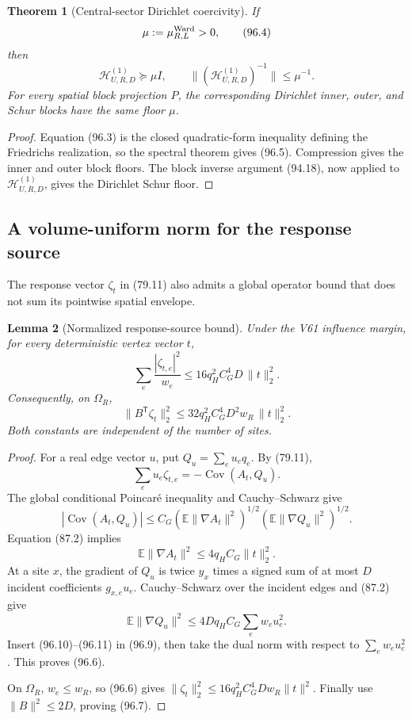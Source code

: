 \documentclass[11pt]{article}
\newtheorem{theorem}{Theorem}[section]
\newtheorem{lemma}[theorem]{Lemma}
\theoremstyle{remark}
\begin{document}
\begin{theorem}[Central-sector Dirichlet coercivity]
\label{thm:v17v96-dirichlet}
If
\[
 \mu:=\mu_{R,L}^{\rm Ward}>0,                       \tag{96.4}
\]
then
\[
\boxed{
 \mathscr H_{U,R,D}^{(1)}\succeq\mu I,
 \qquad
 \| (\mathscr H_{U,R,D}^{(1)})^{-1}\|
 \leq\mu^{-1}.}                                    \tag{96.5}
\]
For every spatial block projection \(P\), the corresponding
Dirichlet inner, outer, and Schur blocks have the same floor \(\mu\).
\end{theorem}

\begin{proof}
Equation (96.3) is the closed quadratic-form inequality defining the
Friedrichs realization, so the spectral theorem gives (96.5).
Compression gives the inner and outer block floors.  The block inverse
argument (94.18), now applied to
\(\mathscr H_{U,R,D}^{(1)}\), gives the Dirichlet Schur floor.
\end{proof}

\subsection{A volume-uniform norm for the response source}

The response vector \(\zeta_t\) in (79.11) also admits a global
operator bound that does not sum its pointwise spatial envelope.

\begin{lemma}[Normalized response-source bound]
\label{lem:v17v96-source}
Under the V61 influence margin, for every deterministic vertex vector
\(t\),
\[
\boxed{
 \sum_e\frac{|\zeta_{t,e}|^2}{w_e}
 \leq16q_H^2C_G^4D\,\|t\|_2^2.}                    \tag{96.6}
\]
Consequently, on \(\Omega_R\),
\[
 \|B^{\mathsf T}\zeta_t\|_2^2
 \leq32q_H^2C_G^4D^2w_R\,\|t\|_2^2.               \tag{96.7}
\]
Both constants are independent of the number of sites.
\end{lemma}

\begin{proof}
For a real edge vector \(u\), put \(Q_u=\sum_eu_eq_e\).  By
(79.11),
\[
 \sum_eu_e\zeta_{t,e}=-\operatorname{Cov}(A_t,Q_u).\tag{96.8}
\]
The global conditional Poincar\'e inequality and Cauchy--Schwarz give
\[
 |\operatorname{Cov}(A_t,Q_u)|
 \leq C_G
  (\mathbb E\|\nabla A_t\|^2)^{1/2}
  (\mathbb E\|\nabla Q_u\|^2)^{1/2}.                \tag{96.9}
\]
Equation (87.2) implies
\[
 \mathbb E\|\nabla A_t\|^2
 \leq4q_HC_G\|t\|_2^2.                              \tag{96.10}
\]
At a site \(x\), the gradient of \(Q_u\) is twice \(y_x\) times a
signed sum of at most \(D\) incident coefficients \(g_{x,e}u_e\).
Cauchy--Schwarz over the incident edges and (87.2) give
\[
 \mathbb E\|\nabla Q_u\|^2
 \leq4Dq_HC_G\sum_ew_eu_e^2.                       \tag{96.11}
\]
Insert (96.10)--(96.11) in (96.9), then take the dual norm with
respect to \(\sum_ew_eu_e^2\).  This proves (96.6).

On \(\Omega_R\), \(w_e\leq w_R\), so (96.6) gives
\(\|\zeta_t\|_2^2\leq16q_H^2C_G^4Dw_R\|t\|^2\).
Finally use \(\|B\|^2\leq2D\), proving (96.7).
\end{proof}
\end{document}
